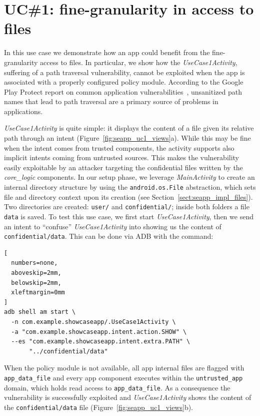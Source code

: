 \section{UC\#1: fine-granularity in access to files}\label{appendix:seapp_uc1}

In this use case we demonstrate how an app could benefit from the
fine-granularity access to files.  In particular, we show how the {\em
  UseCase1Activity}, suffering of a path traversal vulnerability,
cannot be exploited when the app is associated with a properly
configured policy module.  According to the Google Play Protect report
on common application
vulnerabilities~\cite{seapp_common_play_protect_vulnerabilites},
unsanitized path names that lead to path traversal are a primary
source of problems in applications.

{\em UseCase1Activity} is quite simple: it displays the content of a
file given its relative path through an intent
(Figure~\ref{fig:seapp_uc1_views}a). While this may be fine when the
intent comes from trusted components, the activity supports also
implicit intents coming from untrusted sources. This makes the
vulnerability easily exploitable by an attacker targeting the
confidential files written by the {\em core\_logic} components.
%
In our setup phase, we leverage {\em MainActivity} to create an
internal directory structure by using the {\tt android.os.File}
abstraction, which sets file and directory context upon its creation
(see Section~\ref{sect:seapp_impl_files}). Two directories are
created: {\tt user/} and {\tt confidential/}; inside both folders a
file {\tt data} is saved.
%
To test this use case, we first start {\em UseCase1Activity}, then we
send an intent to ``confuse'' {\em UseCase1Activity} into showing us
the content of {\tt confidential/data}. This can be done via ADB with
the command:
\begin{lstlisting}[
  numbers=none,
  aboveskip=2mm,
  belowskip=2mm,
  xleftmargin=0mm
]
adb shell am start \
  -n com.example.showcaseapp/.UseCase1Activity \
  -a "com.example.showcaseapp.intent.action.SHOW" \
  --es "com.example.showcaseapp.intent.extra.PATH" \
       "../confidential/data"
\end{lstlisting}

When the policy module is not available, all app internal files are
flagged with {\tt app\_data\_file} and every app component executes
within the {\tt untrusted\_app} domain, which holds read access to
{\tt app\_data\_file}. As a consequence the vulnerability is
successfully exploited and {\em UseCase1Activity} shows the content of
the {\tt confidential/data} file (Figure~\ref{fig:seapp_uc1_views}b).

